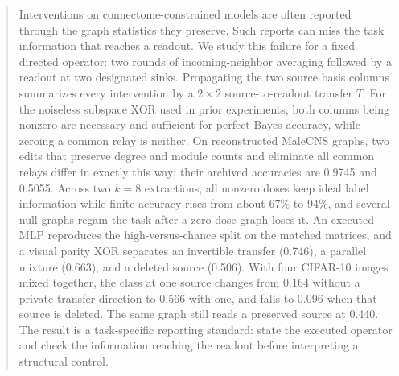 \begin{abstract}
Interventions on connectome-constrained models are often reported through the
graph statistics they preserve. Such reports can miss the task information
that reaches a readout. We study this failure for a fixed directed operator:
two rounds of incoming-neighbor averaging followed by a readout at two
designated sinks. Propagating the two source basis columns summarizes every
intervention by a $2\times2$ source-to-readout transfer $T$. For the noiseless
subspace XOR used in prior experiments, both columns being nonzero are
necessary and sufficient for perfect Bayes accuracy, while zeroing a common
relay is neither. On reconstructed MaleCNS graphs, two edits that preserve
degree and module counts and eliminate all common relays differ in exactly
this way; their archived accuracies are 0.9745 and 0.5055. Across two $k=8$
extractions, all nonzero doses keep ideal label information while finite
accuracy rises from about 67\% to 94\%, and several null graphs regain the
task after a zero-dose graph loses it. An executed MLP reproduces the
high-versus-chance split on the matched matrices, and a visual parity XOR
separates an invertible transfer (0.746), a parallel mixture (0.663), and a
deleted source (0.506). With four CIFAR-10 images mixed together, the class
at one source changes from 0.164 without a private transfer direction to
0.566 with one, and falls to 0.096 when that source is deleted. The same
graph still reads a preserved source at 0.440. The result is
a task-specific reporting standard: state the executed operator and check the
information reaching the readout before interpreting a structural control.
\end{abstract}
